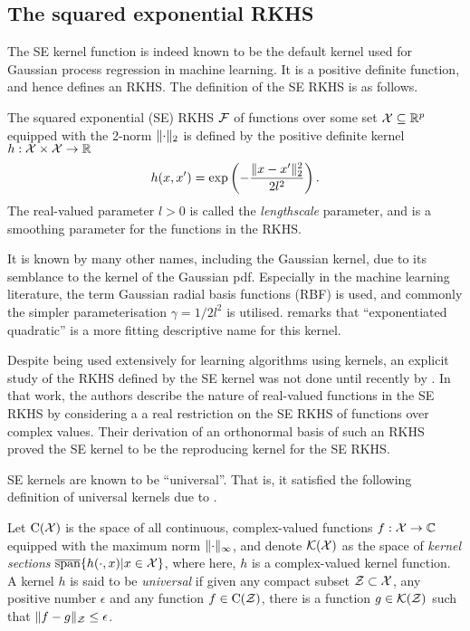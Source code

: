 \documentclass[a4paper,showframe,11pt,draft]{report}
\begin{document}
\subsection{The squared exponential RKHS}

The \gls{SE} kernel function is indeed known to be the default kernel used for Gaussian process regression in machine learning.
It is a positive definite function, and hence defines an RKHS.
The definition of the \gls{SE} RKHS is as follows.

\begin{definition}
  The squared exponential (SE) RKHS ${\mathcal F}$ of functions over some set ${\mathcal X} \subseteq \mathbb{R}^p$ equipped with the 2-norm $\lVert\cdot\rVert_2$ is defined by the positive definite kernel $h:{\mathcal X}\times{\mathcal X}\to\mathbb{R}$ 
  \[
    h(x,x') = \exp\left(-\frac{\lVert x-x'\rVert_2^2}{2l^2} \right).
  \]
  The real-valued parameter $l > 0$ is called the \emph{lengthscale} parameter, and is a smoothing parameter for the functions in the RKHS.
\end{definition}

It is known by many other names, including the Gaussian kernel, due to its semblance to the kernel of the Gaussian pdf. 
Especially in the machine learning literature, the term Gaussian radial basis functions (RBF) is used, and commonly the simpler parameterisation $\gamma = 1 / 2l^2$ is utilised.
\citet{duvenaud2014automatic} remarks that ``exponentiated quadratic'' is a more fitting descriptive name for this kernel.

Despite being used extensively for learning algorithms using kernels, an explicit study of the RKHS defined by the SE kernel was not done until recently by \citet{steinwart2006explicit}.
In that work, the authors describe the nature of real-valued functions in the SE RKHS by considering a a real restriction on the SE RKHS of functions over complex values.
Their derivation of an orthonormal basis of such an RKHS proved the SE kernel to be the reproducing kernel for the SE RKHS.


SE kernels are known to be ``universal''. That is, it satisfied the following definition of universal kernels due to \citet{micchelli2006universal}.

\begin{definition}
  Let $\text{C}({\mathcal X})$ is the space of all continuous, complex-valued functions $f:{\mathcal X}\to\mathbb{C}$ equipped with the maximum norm $\lVert\cdot\rVert_\infty$, and denote ${\mathcal K}({\mathcal X})$ as the space of \emph{kernel sections} $ \overline{\text{span}}\{ h(\cdot,x) | x \in {\mathcal X} \}$, where here, $h$ is a complex-valued kernel function.
  A kernel $h$ is said to be \emph{universal} if given any compact subset ${\mathcal Z} \subset {\mathcal X}$, any positive number $\epsilon$ and any function $f \in \text{C}({\mathcal Z})$, there is a function $g \in {\mathcal K}({\mathcal Z})$ such that $\lVert f-g\rVert_{\mathcal Z} \leq \epsilon$.
\end{definition}
\end{document}

